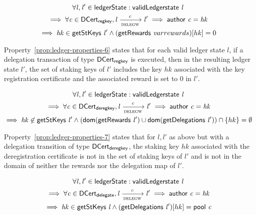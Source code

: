 \begin{property}
  \begin{multline*}
    \forall \var{l}, \var{l'} \in \ledgerState: \applyFun{validLedgerstate}{l}\\
    \implies \forall \var{c} \in \DCertRegKey, \var{l} \trans{delegw}{c} \var{l'}
    \implies \applyFun{author}{c} = \var{hk}\\ \implies
    \var{hk} \in \applyFun{getStKeys}{l'} \wedge
    (\applyFun{getRewards}var{rewards})[hk] = 0
  \end{multline*}
  \label{prop:ledger-properties-6}
\end{property}

Property~\ref{prop:ledger-properties-6} states that for each valid ledger state
$l$, if a delegation transaction of type $\mathsf{DCert_{regkey}}$ is executed, then in the
resulting ledger state $l'$, the set of staking keys of $l'$ includes the key
$hk$ associated with the key registration certificate and the associated reward
is set to 0 in $l'$.

\begin{property}
  \begin{multline*}
    \forall \var{l}, \var{l'} \in \ledgerState: \applyFun{validLedgerstate}{l}\\
    \implies \forall \var{c} \in \DCertDeRegKey, \var{l} \trans{delegw}{c} \var{l'}
    \implies \applyFun{author}{c} = \var{hk}\\ \implies
    \var{hk} \not\in \applyFun{getStKeys}{l'} \wedge
    (\fun{dom}(\applyFun{getRewards}{l'}) \cup
    \fun{dom}(\applyFun{getDelegations}{l'})) \cap \{hk\} = \emptyset
  \end{multline*}
  \label{prop:ledger-properties-7}
\end{property}

Property~\ref{prop:ledger-properties-7} states that for $l, l'$ as above but
with a delegation transition of type $\mathsf{DCert_{deregkey}}$, the staking key $hk$
associated with the deregistration certificate is not in the set of staking keys
of $l'$ and is not in the domain of neither the rewards nor the delegation map
of $l'$.

\begin{property}
  \begin{multline*}
    \forall \var{l}, \var{l'} \in \ledgerState: \applyFun{validLedgerstate}{l}\\
    \implies \forall \var{c} \in \DCertDeleg, \var{l} \trans{delegw}{c} \var{l'}
    \implies \applyFun{author}{c} = \var{hk}\\ \implies
    \var{hk} \in \applyFun{getStKeys}{l} \wedge
    (\applyFun{getDelegations}{l'})[hk] = \applyFun{pool}{c}
  \end{multline*}
  \label{prop:ledger-properties-8}
\end{property}

